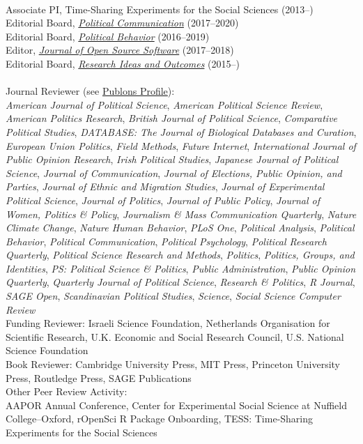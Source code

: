\documentclass[12pt]{article}
\renewcommand{\section}[1]{\pagebreak[3]%
    \llap{\scshape\smash{\parbox[t]{\marginparwidth}{\raggedright {\color{lg}#1}}}}%
    \vspace{-\baselineskip}\par}
\newcommand{\topic}[1]{\pagebreak[3]\indent {\color{lg}{\footnotesize #1 }}\\}
\newcommand{\entry}[1]{\indent {\color{lg}\guillemotright}\hspace{2pt}#1\vspace{.25em}\\}
\begin{document}
\section{Editing \&\\ Reviewing}
\topic{Editing}
	\entry{Associate PI, Time-Sharing Experiments for the Social Sciences (2013--)}
	\entry{Editorial Board, \href{http://www.tandfonline.com/toc/upcp20/current}{\textit{Political Communication}} (2017--2020)}
    \entry{Editorial Board, \href{http://link.springer.com/journal/11109}{\textit{Political Behavior}} (2016--2019)}
	\entry{Editor, \href{http://joss.theoj.org/}{\textit{Journal of Open Source Software}} (2017--2018)}
	\entry{Editorial Board, \href{http://riojournal.com/}{\textit{Research Ideas and Outcomes}} (2015--)}

\topic{Peer Review Activity}
	\entry{Journal Reviewer (see \href{https://publons.com/a/634082/}{Publons Profile}):\\\textit{American Journal of Political Science}, \textit{American Political Science Review}, \textit{American Politics Research}, \textit{British Journal of Political Science}, \textit{Comparative Political Studies}, \textit{DATABASE: The Journal of Biological Databases and Curation}, \textit{European Union Politics}, \textit{Field Methods}, \textit{Future Internet}, \textit{International Journal of Public Opinion Research}, \textit{Irish Political Studies}, \textit{Japanese Journal of Political Science}, \textit{Journal of Communication}, \textit{Journal of Elections, Public Opinion, and Parties}, \textit{Journal of Ethnic and Migration Studies}, \textit{Journal of Experimental Political Science}, \textit{Journal of Politics}, \textit{Journal of Public Policy}, \textit{Journal of Women, Politics \& Policy}, \textit{Journalism \& Mass Communication Quarterly}, \textit{Nature Climate Change}, \textit{Nature Human Behavior}, \textit{PLoS One}, \textit{Political Analysis}, \textit{Political Behavior}, \textit{Political Communication}, \textit{Political Psychology}, \textit{Political Research Quarterly}, \textit{Political Science Research and Methods}, \textit{Politics}, \textit{Politics, Groups, and Identities}, \textit{PS: Political Science \& Politics}, \textit{Public Administration}, \textit{Public Opinion Quarterly}, \textit{Quarterly Journal of Political Science}, \textit{Research \& Politics}, \textit{R Journal}, \textit{SAGE Open}, \textit{Scandinavian Political Studies}, \textit{Science}, \textit{Social Science Computer Review}}
	\entry{Funding Reviewer: Israeli Science Foundation, Netherlands Organisation for Scientific Research, U.K. Economic and Social Research Council, U.S. National Science Foundation}
	\entry{Book Reviewer: Cambridge University Press, MIT Press, Princeton University Press, Routledge Press, SAGE Publications}
	\entry{Other Peer Review Activity:\\ AAPOR Annual Conference, Center for Experimental Social Science at Nuffield College--Oxford, rOpenSci R Package Onboarding, TESS: Time-Sharing Experiments for the Social Sciences}
\end{document}

